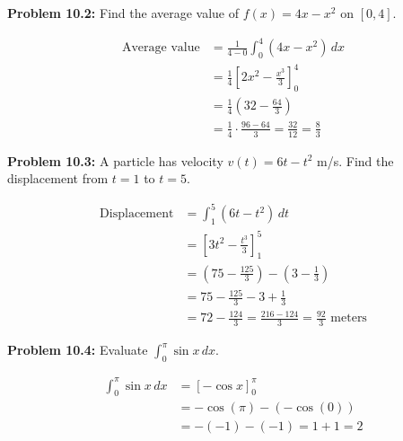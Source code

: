 \documentclass[12pt,a4paper]{book}
\theoremstyle{definition}
\begin{document}
\begin{solution}
\textbf{Problem 10.2:} Find the average value of $f(x) = 4x - x^2$ on $[0, 4]$.

\begin{align}
\text{Average value} &= \frac{1}{4-0} \int_0^4 (4x - x^2) \, dx\\
&= \frac{1}{4} \left[ 2x^2 - \frac{x^3}{3} \right]_0^4\\
&= \frac{1}{4} \left( 32 - \frac{64}{3} \right)\\
&= \frac{1}{4} \cdot \frac{96 - 64}{3} = \frac{32}{12} = \frac{8}{3}
\end{align}
\end{solution}

\begin{solution}
\textbf{Problem 10.3:} A particle has velocity $v(t) = 6t - t^2$ m/s. Find the displacement from $t = 1$ to $t = 5$.

\begin{align}
\text{Displacement} &= \int_1^5 (6t - t^2) \, dt\\
&= \left[ 3t^2 - \frac{t^3}{3} \right]_1^5\\
&= \left( 75 - \frac{125}{3} \right) - \left( 3 - \frac{1}{3} \right)\\
&= 75 - \frac{125}{3} - 3 + \frac{1}{3}\\
&= 72 - \frac{124}{3} = \frac{216 - 124}{3} = \frac{92}{3} \text{ meters}
\end{align}
\end{solution}

\begin{solution}
\textbf{Problem 10.4:} Evaluate $\int_0^{\pi} \sin x \, dx$.

\begin{align}
\int_0^{\pi} \sin x \, dx &= [-\cos x]_0^{\pi}\\
&= -\cos(\pi) - (-\cos(0))\\
&= -(-1) - (-1) = 1 + 1 = 2
\end{align}
\end{solution}
\end{document}
